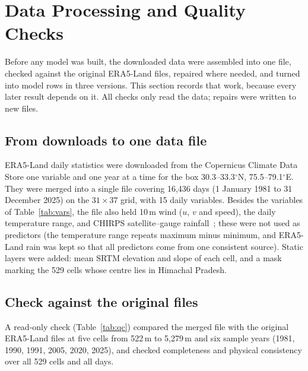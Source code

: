 \documentclass[12pt,a4paper]{report}
\begin{document}
\section{Data Processing and Quality Checks}
\label{sec:processing}
Before any model was built, the downloaded data were assembled into one file, checked against the original
ERA5-Land files, repaired where needed, and turned into model rows in three versions. This section records that
work, because every later result depends on it. All checks only read the data; repairs were written to new files.

\subsection{From downloads to one data file}
ERA5-Land daily statistics were downloaded from the Copernicus Climate Data Store one variable and one year at a
time for the box 30.3--33.3$^\circ$N, 75.5--79.1$^\circ$E. They were merged into a single file covering 16{,}436 days
(1 January 1981 to 31 December 2025) on the $31\times37$ grid, with 15 daily variables. Besides the variables of
Table~\ref{tab:vars}, the file also held 10\,m wind ($u$, $v$ and speed), the daily temperature range, and CHIRPS
satellite--gauge rainfall~\cite{funk2015chirps}; these were not used as predictors (the temperature range repeats
maximum minus minimum, and ERA5-Land rain was kept so that all predictors come from one consistent source). Static
layers were added: mean SRTM elevation and slope of each cell, and a mask marking the 529 cells whose centre lies in
Himachal Pradesh.

\subsection{Check against the original files}
A read-only check (Table~\ref{tab:qc}) compared the merged file with the original ERA5-Land files at five cells from
522\,m to 5{,}279\,m and six sample years (1981, 1990, 1991, 2005, 2020, 2025), and checked completeness and physical
consistency over all 529 cells and all days.
\end{document}
